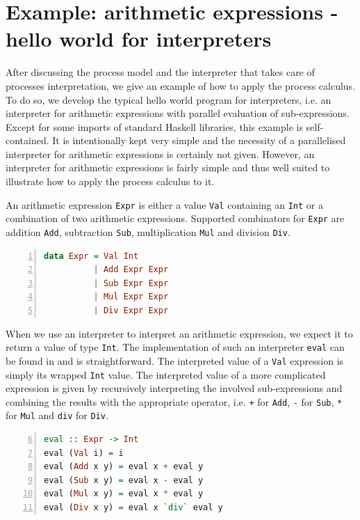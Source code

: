 \section{Example: arithmetic expressions - hello world for interpreters}
\label{chp:example}
After discussing the process model and the interpreter that takes care of processes interpretation, we give an example of how to apply the process calculus. To do so, we develop the typical hello world program for interpreters, i.e. an interpreter for arithmetic expressions with parallel evaluation of sub-expressions. Except for some imports of standard \textsf{Haskell} libraries, this example is self-contained. It is intentionally kept very simple and the necessity of a parallelised interpreter for arithmetic expressions is certainly not given. However, an interpreter for arithmetic expressions is fairly simple and thus well suited to illustrate how to apply the process calculus to it.

An arithmetic expression \texttt{Expr} is either a value \texttt{Val} containing an \texttt{Int} or a combination of two arithmetic expressions. Supported combinators for \texttt{Expr} are addition \texttt{Add}, subtraction \texttt{Sub}, multiplication \texttt{Mul} and division \texttt{Div}.
\begin{lstlisting}[language=Haskell, caption=Data model for the representation of arithmetic expressions., label=lst:arith_model, numbers=left, frame=bt]
data Expr = Val Int
          | Add Expr Expr
          | Sub Expr Expr
          | Mul Expr Expr
          | Div Expr Expr
\end{lstlisting}

When we use an interpreter to interpret an arithmetic expression, we expect it to return a value of type \texttt{Int}. The implementation of such an interpreter \texttt{eval} can be found in  and is straightforward. The interpreted value of a \texttt{Val} expression is simply its wrapped \texttt{Int} value. The interpreted value of a more complicated expression is given by recursively interpreting the involved sub-expressions and combining the results with the appropriate operator, i.e. \texttt{+} for \texttt{Add}, \texttt{-} for \texttt{Sub}, \texttt{*} for \texttt{Mul} and \texttt{div} for \texttt{Div}.
\begin{lstlisting}[language=Haskell, caption=Implementation of an interpreter for arithmetic expressions of type \texttt{Expr}., label=lst:arith_eval, numbers=left, frame=bt, firstnumber=6]
eval :: Expr -> Int
eval (Val i) = i
eval (Add x y) = eval x + eval y
eval (Sub x y) = eval x - eval y
eval (Mul x y) = eval x * eval y
eval (Div x y) = eval x `div` eval y
\end{lstlisting}

